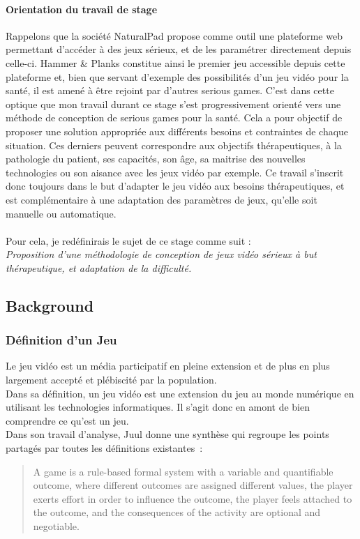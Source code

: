 	\paragraph{Orientation du travail de stage \\}
Rappelons que la société NaturalPad propose comme outil une plateforme web permettant d'accéder à des jeux sérieux, et de les paramétrer directement depuis celle-ci. Hammer \& Planks constitue ainsi le premier jeu accessible depuis cette plateforme et, bien que servant d'exemple des possibilités d'un jeu vidéo pour la santé, il est amené à être rejoint par d'autres serious games. C'est dans cette optique que mon travail durant ce stage s'est progressivement orienté vers une méthode de conception de serious games pour la santé. Cela a pour objectif de proposer une solution appropriée aux différents besoins et contraintes de chaque situation. Ces derniers peuvent correspondre aux objectifs thérapeutiques, à la pathologie du patient, ses capacités, son âge, sa maitrise des nouvelles technologies ou son aisance avec les jeux vidéo par exemple.
Ce travail s'inscrit donc toujours dans le but d'adapter le jeu vidéo aux besoins thérapeutiques, et est complémentaire à une adaptation des paramètres de jeux, qu'elle soit manuelle ou automatique.
 
\paragraph{}Pour cela, je redéfinirais le sujet de ce stage comme suit :\\
\textcolor{marron}{\emph{ {\large Proposition d'une méthodologie de conception de jeux vidéo sérieux à but thérapeutique, et adaptation de la difficulté.}}}

\subsection{Background}
	\subsubsection{Définition d'un Jeu}
Le jeu vidéo est un média participatif en pleine extension et de plus en plus largement accepté et plébiscité par la population. \\Dans sa définition, un jeu vidéo est une extension du jeu au monde numérique en utilisant les technologies informatiques. Il s'agit donc en amont de bien comprendre ce qu'est un jeu. \\Dans son travail d’analyse, Juul\cite{Juul05} donne une synthèse qui regroupe les points partagés par toutes les définitions existantes~:
\begin{quotation}
A game is a rule-based formal system with a variable and quantifiable outcome, where different outcomes are assigned different values, the player exerts effort in order to influence the outcome, the player feels attached to the outcome, and the consequences of the activity are optional and negotiable. 
\end{quotation}
